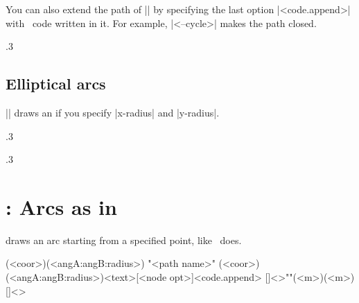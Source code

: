 You can also extend the path of |\tzarc| by specifying the last option |<code.append>| with \Tikz\ code written in it. For example, |<--cycle>| makes the path closed.


\begin{tzcode}{.3}
\end{tzcode}



\subsection{Elliptical arcs}
\label{ss:ellipticalarc}

|\tzarc| draws an  if you specify |x-radius| and |y-radius|.

\begin{tzcode}{.3}
\end{tzcode}


\begin{tzcode}{.3}
\end{tzcode}




\section{\protect{}: Arcs as in \Tikz}
\label{s:tzarcfrom}

\icmd{\tzarcfrom} draws an arc starting from a specified point, like \Tikz\ does.

\begin{tzdef}{}
\tzarcfrom(<coor>)(<angA:angB:radius>)
"<path name>"
      (<coor>)(<angA:angB:radius>){<text>}[<node opt>]<code.append>
  []<>""(<m>)(<m>){}[]<>
\end{tzdef}


